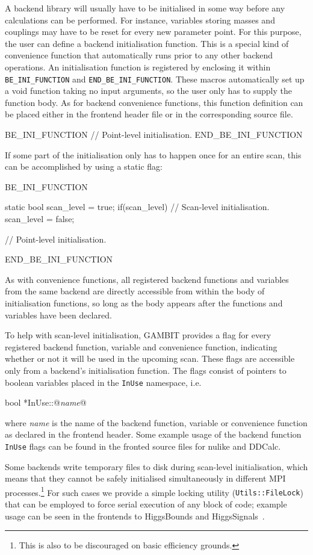 \documentclass[pdftex,twocolumn,epjc3_preprint,runningheads]{svjour3}
\renewcommand{\_}{\discretionary{\underscore}{}{\underscore}}
\newcommand\cpp[1]{{\lstinline!#1!}}  %
\newcommand{\metavarf}[1]{\textit{\color{darkgreen}\footnotesize\textrm{#1}}}
\newcommand{\metavar}{\metavarf}
\newcommand{\gambit}{\textsf{GAMBIT}\xspace}
\newcommand{\GB}{\gambit}
\newcommand{\mpi}{\textsf{MPI}\xspace}
\newcommand\nulike{\textsf{nulike}\xspace}
\newcommand\ddcalc{\textsf{DDCalc}\xspace}
\begin{document}
A backend library will usually have to be initialised in some way before any calculations can be performed. For instance, variables storing masses and couplings may have to be reset for every new parameter point. For this purpose, the user can define a backend initialisation function. This is a special kind of convenience function that automatically runs prior to any other backend operations.  An initialisation function is registered by enclosing it within \lstinline|BE_INI_FUNCTION| and \lstinline|END_BE_INI_FUNCTION|. These macros automatically set up a void function taking no input arguments, so the user only has to supply the function body. As for backend convenience functions, this function definition can be placed either in the frontend header file or in the corresponding source file.
\begin{lstcpp}
BE_INI_FUNCTION
{
  // Point-level initialisation.
}
END_BE_INI_FUNCTION
\end{lstcpp}
If some part of the initialisation only has to happen once for an entire scan, this can be accomplished by using a static flag:
\begin{lstcpp}
BE_INI_FUNCTION
{
  static bool scan_level = true;
  if(scan_level)
  {
    // Scan-level initialisation.
  }
  scan_level = false;

  // Point-level initialisation.
}
END_BE_INI_FUNCTION
\end{lstcpp}
As with convenience functions, all registered backend functions and variables from the same backend are directly accessible from within the body of initialisation functions, so long as the body appears after the functions and variables have been declared.

To help with scan-level initialisation, \GB provides a flag for every registered backend function, variable and convenience function, indicating whether or not it will be used in the upcoming scan.  These flags are accessible only from a backend's initialisation function. The flags consist of pointers to boolean variables placed in the \cpp{InUse} namespace, i.e.
\begin{lstcpp}
bool *InUse::@\metavar{name}@
\end{lstcpp}
where \metavar{name} is the name of the backend function, variable or convenience function as declared in the frontend header. Some example usage of the backend function \cpp{InUse} flags can be found in the fronted source files for \nulike \cite{IC79_SUSY,IC22Methods} and \ddcalc \cite{DarkBit}.

Some backends write temporary files to disk during scan-level initialisation, which means that they cannot be safely initialised simultaneously in different \mpi processes.\footnote{This is also to be discouraged on basic  efficiency grounds.}  For such cases we provide a simple locking utility (\cpp{Utils::FileLock}) that can be employed to force serial execution of any block of code; example usage can be seen in the frontends to \textsf{HiggsBounds} and \textsf{HiggsSignals}~\cite{Bechtle:2008jh,Bechtle:2011sb,Bechtle:2013wla}.
\end{document}
